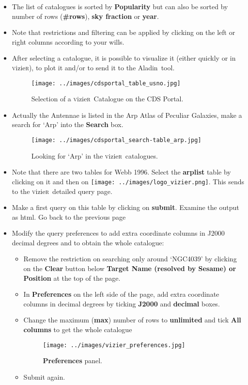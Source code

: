 \documentclass [a4paper, 12pt]{article}
\newcommand{\aladin}{{\textsc{A}{ladin}}}
\newcommand{\vizier}{{\textsc{v}izie\textsc{r}}}
\begin{document}
\begin{itemize}
\item The list of catalogues is sorted by \textbf{Popularity} but can 
also be sorted by number of rows (\textbf{\#rows}), \textbf{sky 
fraction} or \textbf{year}. 
\item Note that restrictions and filtering can be applied by clicking 
on the left or right columns according to your wills.
\item After selecting a catalogue, it is possible to visualize it (either 
quickly or in \vizier), to plot it and/or to send it to the \aladin\ 
tool.
\begin{figure}[H]
\center
\texttt{[image: ../images/cdsportal\_table\_usno.jpg]}
\caption{Selection of a \vizier\ Catalogue on the CDS Portal.}
\label{fig:cdsportal5}
\end{figure}
\item Actually the Antennae is listed in the Arp Atlas of Peculiar 
Galaxies, make a search for `Arp' into the \textbf{Search} box.

\begin{figure}[H]
\center
\texttt{[image: ../images/cdsportal\_search-table\_arp.jpg]}
\caption{Looking for `Arp' in the \vizier\ catalogues.}
\label{fig:arp}
\end{figure}
\item Note that there are two tables for Webb 1996. Select the 
\textbf{arplist} 
table by clicking on it and then on \texttt{[image: ../images/logo\_vizier.png]}. This sends to the \vizier\ detailed 
query 
page.
\item Make a first query on this table by clicking on \textbf{submit}. 
Examine the output as html. Go back to the previous page
\item Modify the query preferences to add extra coordinate columns in 
J2000 decimal degrees and to obtain the whole catalogue:
\begin{itemize}
    \item Remove the restriction on searching only around `NGC4039' by clicking 
    on the \textbf{Clear} button below \textbf{Target Name (resolved by 
        Sesame) or Position} at the top of the page. 
    \item In \textbf{Preferences} on the left side of the page, add extra 
    coordinate columns in decimal degrees by ticking \textbf{J2000} and 
    \textbf{decimal} boxes.
    \item Change the maximum (\textbf{max}) number of rows to 
    \textbf{unlimited} and tick \textbf{All columns} to get the whole 
    catalogue
    \begin{figure}[H]
        \center
        \texttt{[image: ../images/vizier\_preferences.jpg]}
        \caption{\textbf{Preferences} panel.}
        \label{fig:pref}
    \end{figure}
    \item Submit again.
\end{itemize}
\end{itemize}
\end{document}
